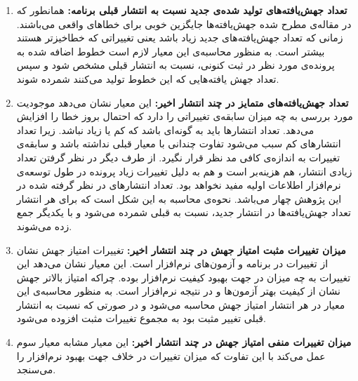 \begin{enumerate}
	\item  
	\textbf{
		تعداد جهش‌یافته‌های تولید شده‌ی جدید نسبت به انتشار قبلی برنامه: }همانطور که در مقاله‌ی \cite{just2014mutants} مطرح شده جهش‌یافته‌ها جایگزین خوبی برای خطاهای واقعی می‌باشند. زمانی که تعداد جهش‌یافته‌های جدید زیاد باشد یعنی تغییراتی که خطا‌خیز‌تر هستند بیشتر است. به منظور محاسبه‌ی این معیار لازم است خطوط اضافه شده به پرونده‌ی مورد نظر در ثبت کنونی، نسبت به انتشار قبلی مشخص شود و سپس تعداد جهش یافته‌هایی که این خطوط تولید می‌کنند شمرده شوند. 
	\item 
	\textbf{
		تعداد جهش‌یافته‌های متمایز در چند انتشار اخیر:} این معیار نشان می‌دهد موجودیت مورد بررسی به چه میزان سابقه‌ی تغییراتی را دارد که احتمال بروز خطا را افزایش می‌دهد. تعداد انتشارها باید به گونه‌ای باشد که کم یا زیاد نباشد. زیرا تعداد انتشارهای کم سبب می‌شود تفاوت چندانی با معیار قبلی نداشته باشد و سابقه‌ی تغییرات به اندازه‌ی کافی مد نظر قرار نگیرد. از طرف دیگر در نظر گرفتن تعداد زیادی انتشار، هم هزینه‌بر است و هم به دلیل تغییرات زیاد  پرونده در طول توسعه‌ی نرم‌افزار اطلاعات اولیه مفید نخواهد بود.  تعداد انتشارهای  در نظر گرفته شده در این پژوهش چهار می‌باشد. نحوه‌ی محاسبه به این شکل است که برای هر انتشار تعداد جهش‌یافته‌ها در انتشار جدید، نسبت به قبلی  شمرده می‌شود و با یکدیگر جمع زده  می‌شوند. 
	
	\item 
	\textbf{
		میزان تغییرات مثبت امتیاز جهش  در چند انتشار اخیر:}
	تغییرات امتیاز جهش نشان از تغییرات در برنامه و آزمون‌های نرم‌افزار است. این معیار نشان می‌دهد این تغییرات به چه میزان در جهت بهبود کیفیت نرم‌افزار بوده. چراکه امتیاز بالاتر جهش نشان از کیفیت بهتر آزمون‌ها و در نتیجه نرم‌افزار است.  به منظور محاسبه‌ی این معیار در هر انتشار امتیاز جهش محاسبه می‌شود و در صورتی که نسبت به انتشار قبلی تغییر مثبت  بود به مجموع تغییرات  مثبت  افزوده می‌شود. 
	\item 
	\textbf{
		میزان تغییرات منفی امتیاز جهش در چند انتشار اخیر:}
	این معیار مشابه معیار سوم عمل می‌کند با این تفاوت که میزان تغییرات در خلاف جهت بهبود نرم‌افزار را می‌سنجد. 	
	
\end{enumerate}


